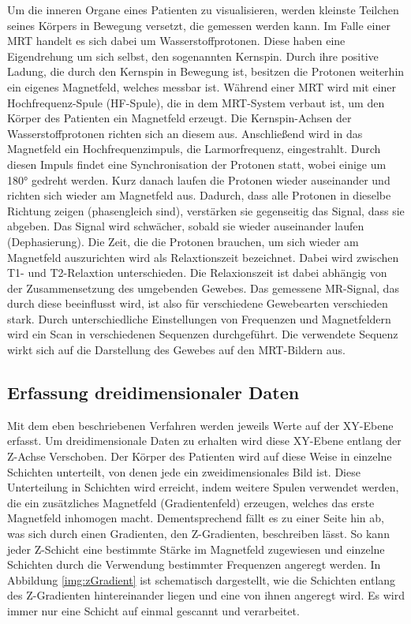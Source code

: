 Um die inneren Organe eines Patienten zu visualisieren, werden kleinste Teilchen seines Körpers in Bewegung versetzt, die gemessen werden kann. Im Falle einer MRT handelt es sich dabei um Wasserstoffprotonen. Diese haben eine Eigendrehung um sich selbst, den sogenannten Kernspin. Durch ihre positive Ladung, die durch den Kernspin in Bewegung ist, besitzen die Protonen weiterhin ein eigenes Magnetfeld, welches messbar ist. 
Während einer MRT wird mit einer Hochfrequenz-Spule (HF-Spule), die in dem MRT-System verbaut ist, um den Körper des Patienten ein Magnetfeld erzeugt. Die Kernspin-Achsen der Wasserstoffprotonen richten sich an diesem aus. Anschließend wird in das Magnetfeld ein Hochfrequenzimpuls, die Larmorfrequenz, eingestrahlt. Durch diesen Impuls findet eine Synchronisation der Protonen statt, wobei einige um 180° gedreht werden. Kurz danach laufen die Protonen wieder auseinander und richten sich wieder am Magnetfeld aus. 
Dadurch, dass alle Protonen in dieselbe Richtung zeigen (phasengleich sind), verstärken sie gegenseitig das Signal, dass sie abgeben. Das Signal wird schwächer, sobald sie wieder auseinander laufen (Dephasierung).
Die Zeit, die die Protonen brauchen, um sich wieder am Magnetfeld auszurichten wird als Relaxtionszeit bezeichnet. Dabei wird zwischen T1- und T2-Relaxtion unterschieden.
Die Relaxionszeit ist dabei abhängig von der Zusammensetzung des umgebenden Gewebes. Das gemessene MR-Signal, das durch diese beeinflusst wird, ist also für verschiedene Gewebearten verschieden stark.
Durch unterschiedliche Einstellungen von Frequenzen und Magnetfeldern wird ein Scan in verschiedenen Sequenzen durchgeführt. Die verwendete Sequenz wirkt sich auf die Darstellung des Gewebes auf den MRT-Bildern aus.

\subsection{Erfassung dreidimensionaler Daten}

Mit dem eben beschriebenen Verfahren werden jeweils Werte auf der XY-Ebene erfasst. Um dreidimensionale Daten zu erhalten wird diese XY-Ebene entlang der Z-Achse Verschoben. Der Körper des Patienten wird auf diese Weise in einzelne Schichten unterteilt, von denen jede ein zweidimensionales Bild ist.
Diese Unterteilung in Schichten wird erreicht, indem weitere Spulen verwendet werden, die ein zusätzliches Magnetfeld (Gradientenfeld) erzeugen, welches das erste Magnetfeld inhomogen macht. Dementsprechend fällt es zu einer Seite hin ab, was sich durch einen Gradienten, den Z-Gradienten, beschreiben lässt. So kann jeder Z-Schicht eine bestimmte Stärke im Magnetfeld zugewiesen und einzelne Schichten durch die Verwendung bestimmter Frequenzen angeregt werden. In Abbildung \ref{img:zGradient} ist schematisch dargestellt, wie die Schichten entlang des Z-Gradienten hintereinander liegen und eine von ihnen angeregt wird.
Es wird immer nur eine Schicht auf einmal gescannt und verarbeitet.

